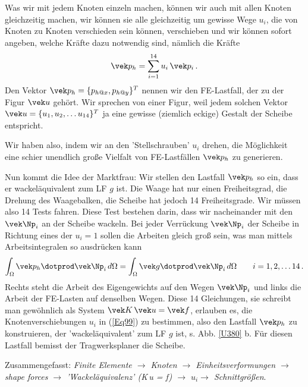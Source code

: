Was wir mit jedem Knoten einzeln machen, k\"{o}nnen wir auch mit allen Knoten gleichzeitig machen, wir k\"{o}nnen sie alle gleichzeitig um gewisse Wege $u_i$, die von Knoten zu Knoten verschieden sein k\"{o}nnen, verschieben und wir k\"{o}nnen sofort angeben, welche Kr\"{a}fte dazu notwendig sind, n\"{a}mlich die Kr\"{a}fte
\begin{align}\label{Eq99}
\vek p_h = \sum_{i = 1}^{14} u_i\,\vek p_i\,.
\end{align}
Den Vektor $\vek p_h = \{p_{h @x}, p_{h @y}\}^T$ nennen wir den FE-Lastfall, der zu der Figur $\vek u$ geh\"{o}rt. Wir sprechen von einer Figur, weil jedem solchen Vektor $\vek u = \{u_1, u_2, \ldots u_{14}\}^T$ ja eine gewisse (ziemlich eckige) Gestalt der Scheibe entspricht.

Wir haben also, indem wir an den 'Stellschrauben' $u_i$ drehen, die M\"{o}glichkeit eine schier unendlich gro{\ss}e Vielfalt von FE-Lastf\"{a}llen $\vek p_h$ zu generieren.

Nun kommt die Idee der Marktfrau: Wir stellen den Lastfall $\vek p_h$ so ein, dass er wackel\"{a}quivalent zum LF $g$ ist. Die Waage hat nur einen Freiheitsgrad, die Drehung des Waagebalken, die Scheibe hat jedoch 14 Freiheitsgrade. Wir m\"{u}ssen also 14 Tests fahren. Diese Test bestehen darin, dass wir nacheinander mit den $\vek \Np_i$ an der Scheibe wackeln. Bei jeder Verr\"{u}ckung $\vek \Np_i$ der Scheibe in Richtung eines der $u_i = 1$ sollen die Arbeiten gleich gro{\ss} sein, was man mittels Arbeitsintegralen so ausdr\"{u}cken kann
\begin{align}
 \int_{\Omega} \vek p_h \dotprod  \vek \Np_i \,d\Omega = \int_{\Omega} \vek g \dotprod \vek \Np_i \,d\Omega \qquad i = 1, 2, \ldots 14\,.
\end{align}
Rechts steht die Arbeit des Eigengewichts auf den Wegen $\vek \Np_i$ und links die Arbeit der FE-Lasten auf denselben Wegen. Diese 14 Gleichungen, sie schreibt man gew\"{o}hnlich als System $\vek K\,\vek u = \vek f$, erlauben es, die Knotenverschiebungen $u_i$ in (\ref{Eq99}) zu bestimmen, also den Lastfall $\vek p_h$ zu konstruieren, der 'wackel\"{a}quivalent' zum LF $g$ ist, s. Abb. \ref{U380} b. F\"{u}r diesen Lastfall bemisst der Tragwerksplaner die Scheibe.

Zusammengefasst: {\em Finite Elemente $ \rightarrow$ Knoten $ \rightarrow$ Einheitsverformungen $ \rightarrow$ shape forces $ \rightarrow$ 'Wackel\"{a}quivalenz' (\vek K\,\vek u = \vek f) $ \rightarrow$ $u_i$$ \rightarrow$ Schnittgr\"{o}{\ss}en\/}.

